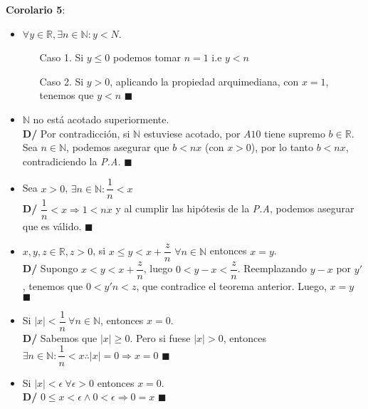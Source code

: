 \documentclass[11pt,a4paper]{article}
\newcommand*{\QEDA}{\null\nobreak\hfill\ensuremath{\blacksquare}}
\begin{document}
\noindent \textbf{Corolario 5}:
\begin{itemize}
\item $\forall y \in \mathbb{R}, \exists n \in \mathbb{N} : y < N$.
\begin{enumerate}
\item [Caso 1. ] Si $y \leq 0$ podemos tomar $n = 1$ i.e $y < n$
\item [Caso 2. ] Si $y > 0$, aplicando la propiedad arquimediana, con $x = 1$, tenemos que $y < n$ \QEDA
\end{enumerate}
\item $\mathbb{N}$ no est\'a acotado superiormente.\\
\textbf{D/} Por contradicci\'on, si $\mathbb{N}$ estuviese acotado, por $A10$ tiene supremo $b \in \mathbb{R}$. Sea $n \in \mathbb{N}$, podemos asegurar que $b < nx$ (con $x > 0$), por lo tanto $b < nx$, contradiciendo la \textit{P.A.} \QEDA
\item Sea $x > 0$, $\exists n \in \mathbb{N} : \dfrac{1}{n} < x$\\
\textbf{D/} $\dfrac{1}{n} < x \Rightarrow 1 < nx$ y al cumplir las hip\'otesis de la \textit{P.A}, podemos asegurar que es v\'alido. \QEDA
\item $x,y,z \in \mathbb{R}, z > 0$, si $x \leq y < x + \dfrac{z}{n}$ $\forall n \in \mathbb{N}$ entonces $x = y$.\\
\textbf{D/} Supongo $x < y < x + \dfrac{z}{n}$, luego $0 < y - x < \dfrac{z}{n}$. Reemplazando $y - x$ por $y'$, tenemos que $0 < y'n < z$, que contradice el teorema anterior. Luego, $x = y$ \QEDA
\item Si $|x| < \dfrac{1}{n}\ \forall n \in \mathbb{N}$, entonces $x = 0$.\\
\textbf{D/} Sabemos que $|x| \geq 0$. Pero si fuese $|x| > 0$, entonces $\exists n \in \mathbb{N} : \dfrac{1}{n} < x \therefore |x| = 0 \Rightarrow x = 0$ \QEDA
\item Si $|x| < \epsilon\ \forall \epsilon > 0$ entonces $x = 0$.\\
\textbf{D/} $0 \leq x < \epsilon \land 0 < \epsilon \Rightarrow 0 = x$ \QEDA
\end{itemize}
\end{document}
